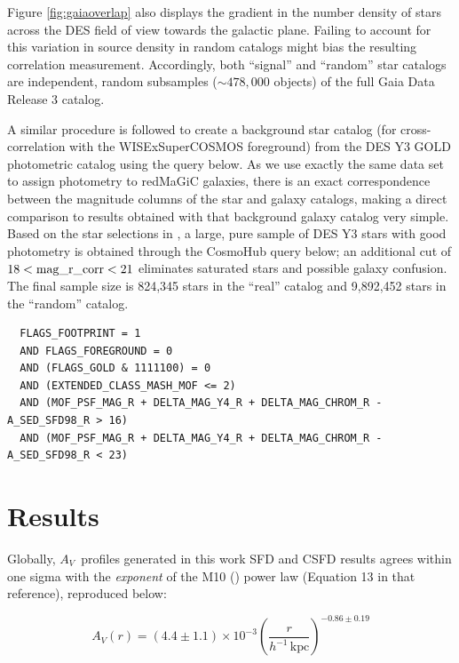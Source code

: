 \documentclass[11pt, oneside]{article}   	%
\newcommand{\av}{$A_V$~}
\begin{document}
Figure \ref{fig:gaiaoverlap} also displays the gradient in the number density of stars across the DES field of view towards the galactic plane. Failing to account for this variation in source density in random catalogs might bias the resulting correlation measurement. Accordingly, both ``signal'' and ``random'' star catalogs are independent, random subsamples ($\sim 478,000$ objects) of the full Gaia Data Release 3 catalog.

A similar procedure is followed to create a background star catalog (for cross-correlation with the WISExSuperCOSMOS foreground) from the DES Y3 GOLD photometric catalog using the query below. As we use exactly the same data set to assign photometry to redMaGiC galaxies, there is an exact correspondence between the magnitude columns of the star and galaxy catalogs, making a direct comparison to results obtained with that background galaxy catalog very simple. Based on the star selections in \cite{2021ApJS..254...24S}, a large, pure sample of DES Y3 stars with good photometry is obtained through the CosmoHub query below; an additional cut of $18 < \rm{mag\_r\_corr} < 21$ eliminates saturated stars and possible galaxy confusion. The final sample size is 824,345 stars in the ``real'' catalog and 9,892,452 stars in the ``random'' catalog. 

\small
\begin{verbatim}
  FLAGS_FOOTPRINT = 1
  AND FLAGS_FOREGROUND = 0
  AND (FLAGS_GOLD & 1111100) = 0
  AND (EXTENDED_CLASS_MASH_MOF <= 2)
  AND (MOF_PSF_MAG_R + DELTA_MAG_Y4_R + DELTA_MAG_CHROM_R - A_SED_SFD98_R > 16)
  AND (MOF_PSF_MAG_R + DELTA_MAG_Y4_R + DELTA_MAG_CHROM_R - A_SED_SFD98_R < 23)
\end{verbatim}
\normalsize



\section{Results}\label{sec:results}

Globally, \av profiles generated in this work SFD and CSFD results agrees within one sigma with the \textit{exponent} of the M10 (\cite{2010MNRAS.406.1815M}) power law (Equation 13 in that reference), reproduced below:

\begin{equation}
A_V(r) = \left(4.4 \pm 1.1\right) \times 10^{-3} \left( \frac{r}{h^{-1}\, \mathrm{kpc}} \right)^{-0.86 \pm 0.19}\label{eqn:menard}
\end{equation}
\end{document}
